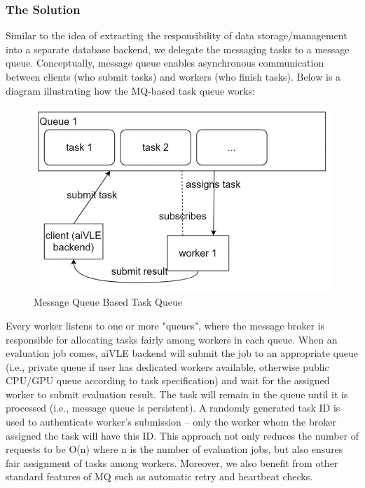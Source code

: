 \documentclass[fyp]{socreport}
\begin{document}
\subsubsection{The Solution}
Similar to the idea of extracting the responsibility of data storage/management into a separate database backend, we delegate the messaging tasks to a message queue. Conceptually, message queue enables asynchronous communication between clients (who submit tasks) and workers (who finish tasks). Below is a diagram illustrating how the MQ-based task queue works:
\begin{figure}[H]
    \centering
    \includegraphics{images/aivle-web-mq.png}
    \caption{Message Queue Based Task Queue}
    \label{fig:aivle-web-mq}
\end{figure}
Every worker listens to one or more "queues", where the message broker is responsible for allocating tasks fairly among workers in each queue. When an evaluation job comes, aiVLE backend will submit the job to an appropriate queue (i.e., private queue if user has dedicated workers available, otherwise public CPU/GPU queue according to task specification) and wait for the assigned worker to submit evaluation result. The task will remain in the queue until it is processed (i.e., message queue is persistent). A randomly generated task ID is used to authenticate worker's submission – only the worker whom the broker assigned the task will have this ID. This approach not only reduces the number of requests to be O(n) where n is the number of evaluation jobs, but also ensures fair assignment of tasks among workers. Moreover, we also benefit from other standard features of MQ such as automatic retry and heartbeat checks.
\end{document}
